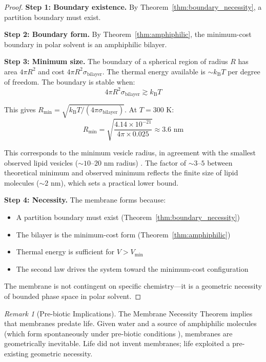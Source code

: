 \documentclass[twocolumn,10pt]{article}
\theoremstyle{remark}
\newtheorem{remark}[theorem]{Remark}
\newcommand{\kB}{k_{\mathrm{B}}}
\begin{document}
\begin{proof}
\textbf{Step 1: Boundary existence.}
By Theorem~\ref{thm:boundary_necessity}, a partition boundary must exist.

\textbf{Step 2: Boundary form.}
By Theorem~\ref{thm:amphiphilic}, the minimum-cost boundary in polar solvent is an amphiphilic bilayer.

\textbf{Step 3: Minimum size.}
The boundary of a spherical region of radius $R$ has area $4\pi R^2$ and cost $4\pi R^2 \sigma_{\text{bilayer}}$. The thermal energy available is $\sim \kB T$ per degree of freedom. The boundary is stable when:
\begin{equation}
    4\pi R^2 \sigma_{\text{bilayer}} \gtrsim \kB T
\end{equation}

This gives $R_{\min} = \sqrt{\kB T / (4\pi\sigma_{\text{bilayer}})}$. At $T = 300$ K:
\begin{equation}
    R_{\min} = \sqrt{\frac{4.14 \times 10^{-21}}{4\pi \times 0.025}} \approx 3.6 \text{ nm}
\end{equation}

This corresponds to the minimum vesicle radius, in agreement with the smallest observed lipid vesicles ($\sim 10$--$20$ nm radius) \cite{helfrich1973,lipowsky1995}. The factor of $\sim 3$--$5$ between theoretical minimum and observed minimum reflects the finite size of lipid molecules ($\sim 2$ nm), which sets a practical lower bound.

\textbf{Step 4: Necessity.}
The membrane forms because:
\begin{itemize}
    \item A partition boundary must exist (Theorem~\ref{thm:boundary_necessity})
    \item The bilayer is the minimum-cost form (Theorem~\ref{thm:amphiphilic})
    \item Thermal energy is sufficient for $V > V_{\min}$
    \item The second law drives the system toward the minimum-cost configuration
\end{itemize}

The membrane is not contingent on specific chemistry---it is a geometric necessity of bounded phase space in polar solvent.
\end{proof}

\begin{remark}[Pre-biotic Implications]
The Membrane Necessity Theorem implies that membranes predate life. Given water and a source of amphiphilic molecules (which form spontaneously under pre-biotic conditions \cite{deamer2017,monnard2002}), membranes are geometrically inevitable. Life did not invent membranes; life exploited a pre-existing geometric necessity.
\end{remark}
\end{document}
